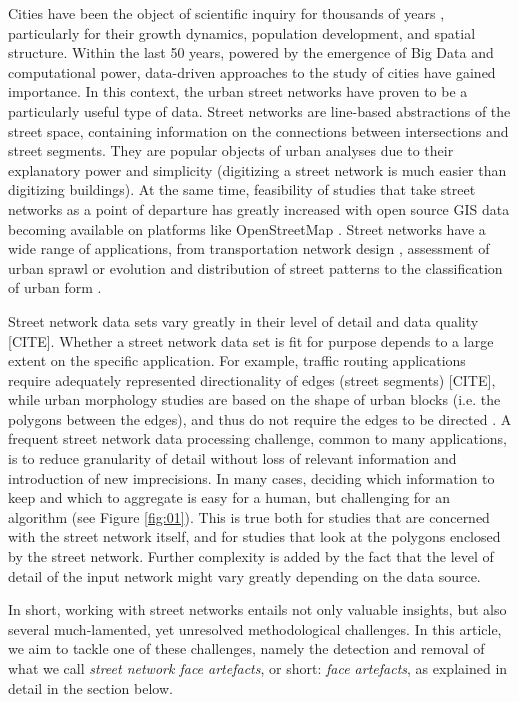 Cities have been the object of scientific inquiry for thousands of years \cite{vitruvius_vitruvius_1999}, particularly for their growth dynamics, population development, and spatial structure. Within the last 50 years, powered by the emergence of Big Data and computational power, data-driven approaches to the study of cities have gained importance. In this context, the urban street networks have proven to be a particularly useful type of data. Street networks are line-based abstractions of the street space, containing information on the connections between intersections and street segments. They are popular objects of urban analyses due to their explanatory power and simplicity (digitizing a street network is much easier than digitizing buildings). At the same time, feasibility of studies that take street networks as a point of departure has greatly increased with open source GIS data becoming available on platforms like OpenStreetMap \cite{arcaute_recent_2021}. Street networks have a wide range of applications, from transportation network design \cite{farahani_review_2013}, assessment of urban sprawl \cite{barrington-leigh_global_2020} or evolution and distribution of street patterns \cite{boeing_multi-scale_2018,boeing2020off} to the classification of urban form \cite{araldi_street_2019,fleischmann_methodological_2021}. 

Street network data sets vary greatly in their level of detail and data quality [CITE]. Whether a street network data set is fit for purpose depends to a large extent on the specific application. For example, traffic routing applications require adequately represented directionality of edges (street segments) [CITE], while urban morphology studies are based on the shape of urban blocks (i.e. the polygons between the edges), and thus do not require the edges to be directed \cite{dibble_origin_2019}. A frequent street network data processing challenge, common to many applications, is to reduce granularity of detail without loss of relevant information and introduction of new imprecisions. In many cases, deciding which information to keep and which to aggregate is easy for a human, but challenging for an algorithm (see Figure \ref{fig:01}). This is true both for studies that are concerned with the street network itself, and for studies that look at the polygons enclosed by the street network. Further complexity is added by the fact that the level of detail of the input network might vary greatly depending on the data source. 

In short, working with street networks entails not only valuable insights, but also several much-lamented, yet unresolved methodological challenges. In this article, we aim to tackle one of these challenges, namely the detection and removal of what we call \textit{street network face artefacts}, or short: \textit{face artefacts}, as explained in detail in the section below. 

